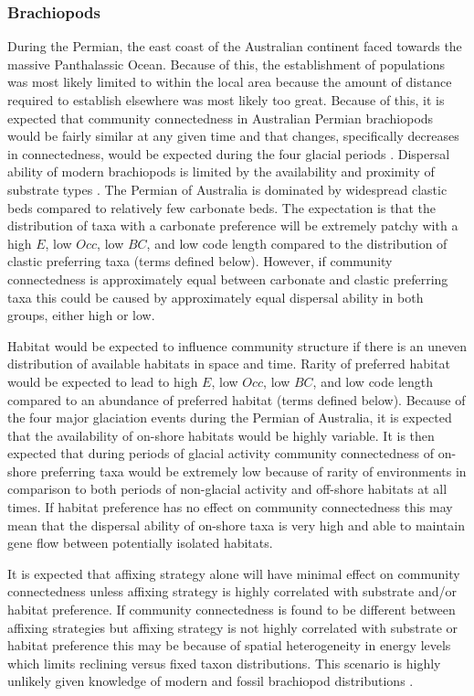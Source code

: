 \documentclass[12pt,letterpaper]{article}
\begin{document}
\subsubsection{Brachiopods}
During the Permian, the east coast of the Australian continent faced towards the massive Panthalassic Ocean. Because of this, the establishment of populations was most likely limited to within the local area because the amount of distance required to establish elsewhere was most likely too great. Because of this, it is expected that community connectedness in Australian Permian brachiopods would be fairly similar at any given time and that changes, specifically decreases in connectedness, would be expected during the four glacial periods \citep{Fielding2008a,Fielding2008}. Dispersal ability of modern brachiopods is limited by the availability and proximity of substrate types \citep{Richardson1997,Richardson1997a}. The Permian of Australia is dominated by widespread clastic beds compared to relatively few carbonate beds. The expectation is that the distribution of taxa with a carbonate preference will be extremely patchy with a high \(E\), low \(Occ\), low \(BC\), and low code length compared to the distribution of clastic preferring taxa (terms defined below). However, if community connectedness is approximately equal between carbonate and clastic preferring taxa this could be caused by approximately equal dispersal ability in both groups, either high or low.

Habitat would be expected to influence community structure if there is an uneven distribution of available habitats in space and time. Rarity of preferred habitat would be expected to lead to high \(E\), low \(Occ\), low \(BC\), and low code length compared to an abundance of preferred habitat (terms defined below). Because of the four major glaciation events during the Permian of Australia, it is expected that the availability of on-shore habitats would be highly variable. It is then expected that during periods of glacial activity community connectedness of on-shore preferring taxa would be extremely low because of rarity of environments in comparison to both periods of non-glacial activity and off-shore habitats at all times. If habitat preference has no effect on community connectedness this may mean that the dispersal ability of on-shore taxa is very high and able to maintain gene flow between potentially isolated habitats.

It is expected that affixing strategy alone will have minimal effect on community connectedness unless affixing strategy is highly correlated with substrate and/or habitat preference. If community connectedness is found to be different between affixing strategies but affixing strategy is not highly correlated with substrate or habitat preference this may be because of spatial heterogeneity in energy levels which limits reclining versus fixed taxon distributions. This scenario is highly unlikely given knowledge of modern and fossil brachiopod distributions \citep{Rudwick1970,Richardson1997,Richardson1997a}.
\end{document}
